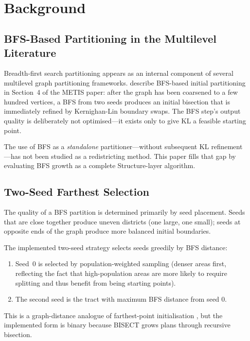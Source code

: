 \section{Background}
\label{sec:background}

\subsection{BFS-Based Partitioning in the Multilevel Literature}

Breadth-first search partitioning appears as an internal component of
several multilevel graph partitioning frameworks.
\citet{karypis1998} describe BFS-based initial partitioning in Section~4
of the METIS paper: after the graph has been coarsened to a few hundred
vertices, a BFS from two seeds produces an initial bisection that is
immediately refined by Kernighan-Lin boundary swaps.
The BFS step's output quality is deliberately not optimised---it exists
only to give KL a feasible starting point.

The use of BFS as a \emph{standalone} partitioner---without subsequent
KL refinement---has not been studied as a redistricting method.
This paper fills that gap by evaluating BFS growth as a complete
Structure-layer algorithm.

\subsection{Two-Seed Farthest Selection}

The quality of a BFS partition is determined primarily by seed placement.
Seeds that are close together produce uneven districts (one large, one
small); seeds at opposite ends of the graph produce more balanced initial
boundaries.

The implemented two-seed strategy selects seeds greedily by BFS distance:
\begin{enumerate}
\item Seed~0 is selected by population-weighted sampling (denser areas
  first, reflecting the fact that high-population areas are more likely
  to require splitting and thus benefit from being starting points).
\item The second seed is the tract with maximum BFS distance from seed 0.
\end{enumerate}
This is a graph-distance analogue of farthest-point initialisation
\citep{cormen2009}, but the implemented form is binary because BISECT grows
plans through recursive bisection.

